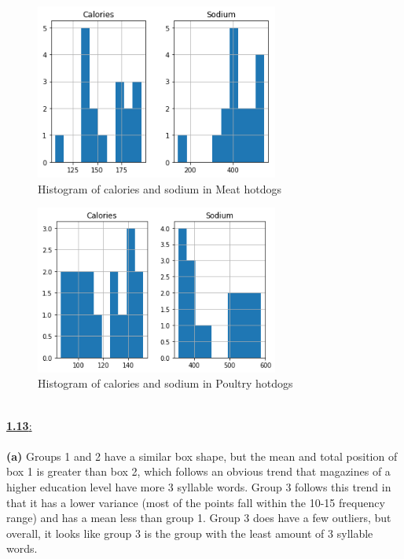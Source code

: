 \documentclass[11pt]{article}
\begin{document}
\begin{figure}[h!]
	\centering
	\includegraphics[width=80mm]{meat_hist.png}
	\caption{Histogram of calories and sodium in Meat hotdogs}
\end{figure}
\begin{figure}[h!]
	\centering
	\includegraphics[width=80mm]{poultry_hist.png}
	\caption{Histogram of calories and sodium in Poultry hotdogs}
\end{figure}
\newpage
\ \\
\underline{\textbf{1.13}:} \\ \\
\textbf{(a)} Groups 1 and 2 have a similar box shape, but the mean and total position of box 1 is greater than box 2, which follows an obvious trend that magazines of a higher education level have more 3 syllable words. Group 3 follows this trend in that it has a lower variance (most of the points fall within the 10-15 frequency range) and has a mean less than group 1. Group 3 does have a few outliers, but overall, it looks like group 3 is the group with the least amount of 3 syllable words. \\
\end{document}
